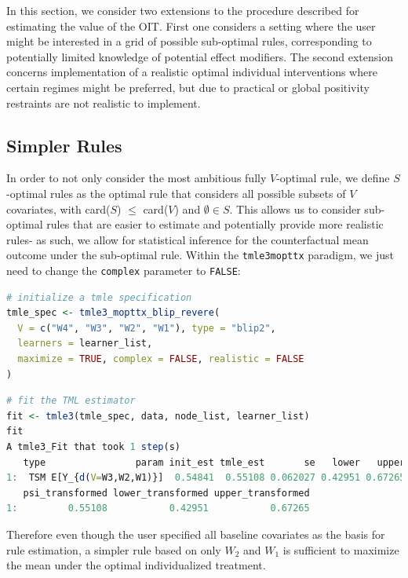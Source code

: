 \documentclass[12pt, krantz2,]{krantz}
\newcommand{\passthrough}[1]{#1}
\theoremstyle{definition}
\theoremstyle{definition}
\theoremstyle{definition}
\newcommand{\1}{\mathbbm{1}}
\begin{document}
In this section, we consider two extensions to the procedure described for
estimating the value of the OIT. First one considers a setting where the user
might be interested in a grid of possible sub-optimal rules, corresponding to
potentially limited knowledge of potential effect modifiers. The second
extension concerns implementation of a realistic optimal individual
interventions where certain regimes might be preferred, but due to practical or
global positivity restraints are not realistic to implement.

\hypertarget{simpler-rules}{%
\subsection{Simpler Rules}\label{simpler-rules}}

In order to not only consider the most ambitious fully \(V\)-optimal rule, we
define \(S\)-optimal rules as the optimal rule that considers all possible subsets
of \(V\) covariates, with card(\(S\)) \(\leq\) card(\(V\)) and \(\emptyset \in S\). This
allows us to consider sub-optimal rules that are easier to estimate and
potentially provide more realistic rules- as such, we allow for statistical
inference for the counterfactual mean outcome under the sub-optimal rule.
Within the \passthrough{\lstinline!tmle3mopttx!} paradigm, we just need to change the \passthrough{\lstinline!complex!}
parameter to \passthrough{\lstinline!FALSE!}:

\begin{lstlisting}[language=R]
# initialize a tmle specification
tmle_spec <- tmle3_mopttx_blip_revere(
  V = c("W4", "W3", "W2", "W1"), type = "blip2",
  learners = learner_list,
  maximize = TRUE, complex = FALSE, realistic = FALSE
)
\end{lstlisting}

\begin{lstlisting}[language=R]
# fit the TML estimator
fit <- tmle3(tmle_spec, data, node_list, learner_list)
fit
A tmle3_Fit that took 1 step(s)
   type                param init_est tmle_est       se   lower   upper
1:  TSM E[Y_{d(V=W3,W2,W1)}]  0.54841  0.55108 0.062027 0.42951 0.67265
   psi_transformed lower_transformed upper_transformed
1:         0.55108           0.42951           0.67265
\end{lstlisting}

Therefore even though the user specified all baseline covariates as the basis
for rule estimation, a simpler rule based on only \(W_2\) and \(W_1\) is sufficient
to maximize the mean under the optimal individualized treatment.
\end{document}
